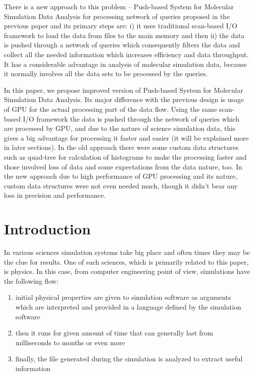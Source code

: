 \documentclass[12pt,letterpaper]{report}
\newcommand\mainmatter{%
    \cleardoublepage
  \pagenumbering{arabic}}
\begin{document}
There is a new approach to this problem -- Push-based System for Molecular Simulation Data Analysis for processing network of queries proposed in the previous paper and its primary steps are: i) it uses traditional scan-based I/O framework to load the data from files to the main memory and then ii) the data is pushed through a network of queries which consequently filters the data and collect all the needed information which increases efficiency and data throughput. It has a considerable advantage in analysis of molecular simulation data, because it normally involves all the data sets to be processed by the queries.

In this paper, we propose improved version of Push-based System for Molecular Simulation Data Analysis. Its major difference with the previous design is usage of GPU for the actual processing part of the data flow. Using the same scan-based I/O framework the data is pushed through the network of queries which are processed by GPU, and due to the nature of science simulation data, this gives a big advantage for processing it faster and easier (it will be explained more in later sections). In the old approach there were some custom data structures such as quad-tree for calculation of histograms to make the processing faster and those involved loss of data and some expectations from the data nature, too. In the new approach due to high performance of GPU processing and its nature, custom data structures were not even needed much, though it didn't bear any loss in precision and performance.



\mainmatter
\linespread{1}\selectfont
\chapter{Introduction} \linespread{2}\selectfont \justify

\hspace{3em} In various sciences simulation systems take big place and often times they may be the clue for results. One of such sciences, which is primarily related to this paper, is physics. In this case, from computer engineering point of view, simulations have the following flow:

\begin{enumerate}
	\item initial physical properties are given to simulation software as arguments which are interpreted and provided in a language defined by the simulation software
	\item then it runs for given amount of time that can generally last from milliseconds to months or even more
	\item finally, the file generated during the simulation is analyzed to extract useful information
\end{enumerate}
\end{document}
